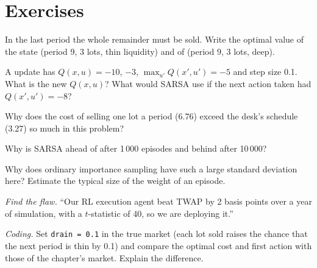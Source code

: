 \section{Exercises}

\begin{exercise}[$\star$]\label{exo:ml:reinforcement-learning-foundations:1}
In the last period the whole remainder must be sold. Write the optimal value of the state (period 9, 3 lots, thin
liquidity) and of (period 9, 3 lots, deep).
\end{exercise}

\begin{exercise}[$\star$]\label{exo:ml:reinforcement-learning-foundations:2}
A  update has $Q(x, u) = -10$,  $-3$, $\max_{u'}Q(x', u') = -5$ and step size 0.1. What is the new $Q(x,
u)$? What would SARSA use if the next action taken had $Q(x', u') = -8$?
\end{exercise}

\begin{exercise}[$\star$]\label{exo:ml:reinforcement-learning-foundations:3}
Why does the cost of selling one lot a period (6.76) exceed the desk's schedule (3.27) so much in this problem?
\end{exercise}

\begin{exercise}[$\star\star$]\label{exo:ml:reinforcement-learning-foundations:4}
Why is SARSA ahead of  after 1\,000 episodes and behind after 10\,000?
\end{exercise}

\begin{exercise}[$\star\star$]\label{exo:ml:reinforcement-learning-foundations:5}
Why does ordinary importance sampling have such a large standard deviation here? Estimate the typical size of the weight of
an episode.
\end{exercise}

\begin{exercise}[$\star\star$]\label{exo:ml:reinforcement-learning-foundations:6}
\emph{Find the flaw.} ``Our RL execution agent beat TWAP by 2 basis points over a year of simulation, with a $t$-statistic of
40, so we are deploying it.''
\end{exercise}

\begin{exercise}[$\star\star\star$]\label{exo:ml:reinforcement-learning-foundations:7}
\emph{Coding.} Set \texttt{drain = 0.1} in the true market (each lot sold raises the chance that the next period is thin by
0.1) and compare the optimal cost and first action with those of the chapter's market. Explain the difference.
\end{exercise}

